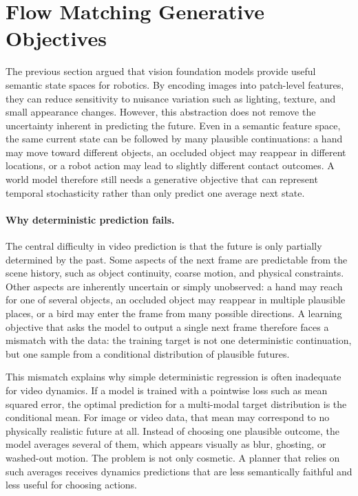 \documentclass[12pt]{report}
\begin{document}
\section{Flow Matching Generative Objectives}
The previous section argued that vision foundation models provide useful semantic state spaces for robotics. By encoding images into patch-level features, they can reduce sensitivity to nuisance variation such as lighting, texture, and small appearance changes. However, this abstraction does not remove the uncertainty inherent in predicting the future. Even in a semantic feature space, the same current state can be followed by many plausible continuations: a hand may move toward different objects, an occluded object may reappear in different locations, or a robot action may lead to slightly different contact outcomes. A world model therefore still needs a generative objective that can represent temporal stochasticity rather than only predict one average next state.

\paragraph{Why deterministic prediction fails.}
The central difficulty in video prediction is that the future is only partially determined by the past. Some aspects of the next frame are predictable from the scene history, such as object continuity, coarse motion, and physical constraints. Other aspects are inherently uncertain or simply unobserved: a hand may reach for one of several objects, an occluded object may reappear in multiple plausible places, or a bird may enter the frame from many possible directions. A learning objective that asks the model to output a single next frame therefore faces a mismatch with the data: the training target is not one deterministic continuation, but one sample from a conditional distribution of plausible futures.

This mismatch explains why simple deterministic regression is often inadequate for video dynamics. If a model is trained with a pointwise loss such as mean squared error, the optimal prediction for a multi-modal target distribution is the conditional mean. For image or video data, that mean may correspond to no physically realistic future at all. Instead of choosing one plausible outcome, the model averages several of them, which appears visually as blur, ghosting, or washed-out motion. The problem is not only cosmetic. A planner that relies on such averages receives dynamics predictions that are less semantically faithful and less useful for choosing actions.
\end{document}
